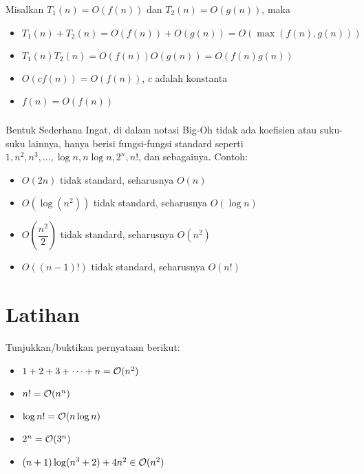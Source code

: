 \documentclass{../praktikum-ppt}
\begin{document}
\begin{frame}
  \frametitle{\insertsection}
  \begin{teorema}
    Misalkan \( T_1(n) = O(f(n)) \) dan \( T_2(n) = O(g(n)) \), maka
    \begin{itemize}
        \item \( T_1(n) + T_2(n) = O(f(n)) + O(g(n)) = O(\max(f(n), g(n))) \)
        \item \( T_1(n)T_2(n) = O(f(n)) O(g(n)) = O(f(n) g(n)) \)
        \item \( O(cf(n)) = O(f(n)) \), \( c \) adalah konstanta
        \item \( f(n) = O(f(n)) \)
    \end{itemize}
  \end{teorema}
\end{frame}

\begin{frame}
  \frametitle{\insertsection}
  \begin{alertblock}{Bentuk Sederhana}
    Ingat, di dalam notasi Big-Oh tidak ada koefisien atau suku-suku lainnya, hanya berisi fungsi-fungsi standard seperti 
    \( 1, n^2, n^3, \dots, \log n, n \log n, 2^n, n! \), dan sebagainya. Contoh:
    \begin{itemize}
      \item \( O(2n) \) tidak standard, seharusnya \( O(n) \)
      \item \( O(\log(n^2)) \) tidak standard, seharusnya \( O(\log n) \)
      \item \( O\left(\dfrac{n^2}{2}\right) \) tidak standard, seharusnya \( O(n^2) \)
      \item \( O((n - 1)!) \) tidak standard, seharusnya \( O(n!) \)
  \end{itemize}
  \end{alertblock}
\end{frame}

\section{Latihan}
\begin{frame}
  \begin{latihan}
  Tunjukkan/buktikan pernyataan berikut:
  \begin{itemize}
    \item $1+2+3+\cdots+n = \mathcal{O}(n^2) $
    \item $n! = \mathcal{O}(n^n) $
    \item $\log n! = \mathcal{O}(n\log n)$
    \item $2^n = \mathcal{O}(3^n)$
    \item $(n+1)\log(n^3+2)+4n^2\in\mathcal{O}(n^2)$
  \end{itemize}
  \end{latihan}
\end{frame}
\end{document}
